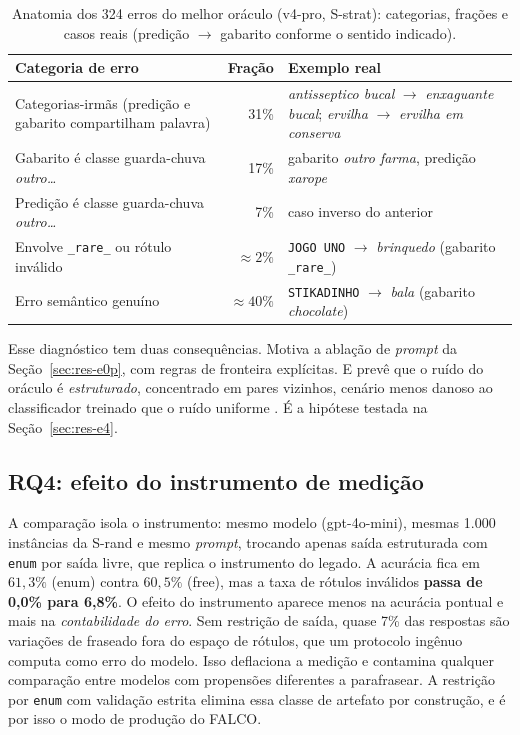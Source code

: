 \begin{table}[htb]
\centering
\caption{Anatomia dos 324 erros do melhor oráculo (v4-pro, S-strat):
categorias, frações e casos reais (predição $\to$ gabarito conforme o
sentido indicado).}
\label{tab:e0-erros}
\small
\begin{tabular}{p{} r p{}}
\toprule
\textbf{Categoria de erro} & \textbf{Fração} & \textbf{Exemplo real} \\
\midrule
Categorias-irmãs (predição e gabarito compartilham palavra) & 31\% &
\textit{antisseptico bucal} $\to$ \textit{enxaguante bucal};
\textit{ervilha} $\to$ \textit{ervilha em conserva} \\
Gabarito é classe guarda-chuva \textit{outro\ldots} & 17\% & gabarito
\textit{outro farma}, predição \textit{xarope} \\
Predição é classe guarda-chuva \textit{outro\ldots} & 7\% & caso inverso
do anterior \\
Envolve \texttt{\_rare\_} ou rótulo inválido & $\approx 2\%$ &
\texttt{JOGO UNO} $\to$ \textit{brinquedo} (gabarito \texttt{\_rare\_}) \\
Erro semântico genuíno & $\approx 40\%$ & \texttt{STIKADINHO} $\to$
\textit{bala} (gabarito \textit{chocolate}) \\
\bottomrule
\end{tabular}
\end{table}

Esse diagnóstico tem duas consequências. Motiva a ablação de \textit{prompt} da
Seção~\ref{sec:res-e0p}, com regras de fronteira explícitas. E prevê que o ruído
do oráculo é \emph{estruturado}, concentrado em pares vizinhos, cenário menos
danoso ao classificador treinado que o ruído uniforme
\citep{Frenay2014,Song2023NoisyLabels}. É a hipótese testada na
Seção~\ref{sec:res-e4}.

\subsection{RQ4: efeito do instrumento de medição}
\label{sec:res-e0-rq4}

A comparação isola o instrumento: mesmo modelo (gpt-4o-mini), mesmas 1.000
instâncias da S-rand e mesmo \textit{prompt}, trocando apenas saída estruturada
com \texttt{enum} por saída livre, que replica o instrumento do legado. A
acurácia fica em $61{,}3\%$ (enum) contra $60{,}5\%$ (free), mas a taxa de
rótulos inválidos \textbf{passa de 0,0\% para 6,8\%}. O efeito do instrumento aparece menos na acurácia pontual e mais na
\emph{contabilidade do erro}. Sem restrição de saída, quase 7\% das respostas
são variações de fraseado fora do espaço de rótulos, que um protocolo ingênuo
computa como erro do modelo. Isso deflaciona a medição e contamina qualquer
comparação entre modelos com propensões diferentes a parafrasear. A restrição
por \texttt{enum} com validação estrita elimina essa classe de artefato por
construção, e é por isso o modo de produção do FALCO.

